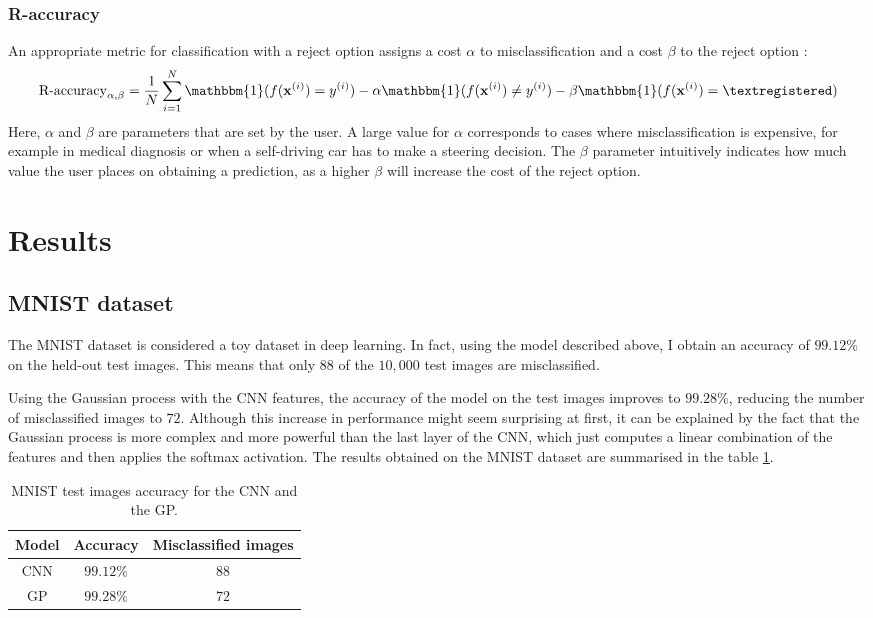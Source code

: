 \documentclass{article}
\begin{document}
\subsubsection{R-accuracy}
 An appropriate metric for classification with a reject option assigns a cost $\alpha$ to misclassification and a cost $\beta$ to the reject option \textregistered:
\begin{equation*}
	\textrm{R-accuracy}_{\alpha, \beta} = \frac{1}{N} \sum_{i=1}^N \mathbbm{1}(f(\mathbf{x}^{(i)}) = y^{(i)}) - \alpha \mathbbm{1}(f(\mathbf{x}^{(i)}) \neq y^{(i)}) - \beta \mathbbm{1}(f(\mathbf{x}^{(i)}) = \textregistered)
\end{equation*}
Here, $\alpha$ and $\beta$ are parameters that are set by the user. A large value for $\alpha$ corresponds to cases where misclassification is expensive, for example in medical diagnosis or when a self-driving car has to make a steering decision. The $\beta$ parameter intuitively indicates how much value the user places on obtaining a prediction, as a higher $\beta$ will increase the cost of the reject option.

\section{Results}
\subsection{MNIST dataset}
The MNIST dataset is considered a toy dataset in deep learning. In fact, using the model described above, I obtain an accuracy of $99.12\%$ on the held-out test images. This means that only $88$ of the $10,000$ test images are misclassified.

Using the Gaussian process with the CNN features, the accuracy of the model on the test images improves to $99.28\%$, reducing the number of misclassified images to $72$. Although this increase in performance might seem surprising at first, it can be explained by the fact that the Gaussian process is more complex and more powerful than the last layer of the CNN, which just computes a linear combination of the features and then applies the softmax activation. The results obtained on the MNIST dataset are summarised in the table \ref{table/mnist_acc}.

\begin{table}[h]
\centering	
{\renewcommand{\arraystretch}{1.2} %
\begin{tabular}{ c | c c}
\textbf{Model} & \textbf{Accuracy} & \textbf{Misclassified images}\\
\hline
CNN & $99.12\%$ & $88$ \\
GP & $99.28\%$  & $72$\\
\end{tabular}
}
\caption{MNIST test images accuracy for the CNN and the GP.}
\label{table/mnist_acc}
\end{table}
\end{document}
